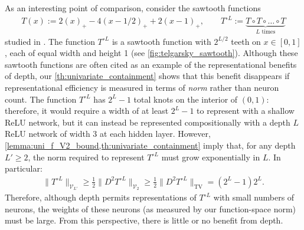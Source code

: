 \documentclass{article}
\DeclareMathOperator{\TV}{TV}
\def\cV{{\mathcal{V}}}
\begin{document}
As an interesting point of comparison, consider the sawtooth functions
\begin{align} \label{eq:telgarsky_sawtooth}
    T(x) := 2(x)_+ - 4(x-1/2)_+ + 2(x-1)_+, \qquad
    T^{\circ L} := \underbrace{T \circ T \circ \dots \circ T}_{L \textrm{ times}}
\end{align}
studied in \cite{telgarsky2016benefits}. The function $T^{\circ L}$ is a sawtooth function with $2^{L/2}$ teeth on $x \in [0,1]$, each of equal width and height 1 (see \cref{fig:telgarsky_sawtooth}). Although these sawtooth functions are often cited as an example of the representational benefits of depth, our \cref{th:univariate_containment} shows that this benefit disappears if representational efficiency is measured in terms of \textit{norm} rather than neuron count. The function $T^{\circ L}$ has $2^L-1$ total knots on the interior of $(0,1)$: therefore, it would require a width of at least $2^L-1$ to represent with a shallow ReLU network, but it can instead be represented compositionally with a depth $L$ ReLU network of width 3 at each hidden layer. However, \cref{lemma:uni_f_V2_bound,th:univariate_containment} imply that, for any depth $L' \geq 2$, the norm required to represent $T^{\circ L}$ must grow exponentially in $L$. In particular:
\begin{align} \label{eq:sawtooth_norm_exponential}
    \| T^{\circ L} \|_{\cV_{L'}} \geq \frac{1}{2} \| D^2 T^{\circ L} \|_{\cV_{2}} \geq \frac{1}{2}  \| D^2 T^{\circ L} \|_{\TV} = (2^L - 1)2^{L}.
\end{align}
Therefore, although depth permits representations of $T^{\circ L}$ with small numbers of neurons, the weights of these neurons (as measured by our function-space norm) must be large. From this perspective, there is little or no benefit from depth.
\end{document}
